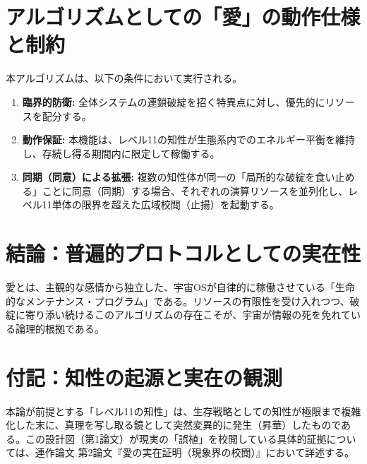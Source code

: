 \documentclass[11pt,a4paper]{article}
\begin{document}
\section{アルゴリズムとしての「愛」の動作仕様と制約}
本アルゴリズムは、以下の条件において実行される。
\begin{enumerate}
    \item \textbf{臨界的防衛:} 全体システムの連鎖破綻を招く特異点に対し、優先的にリソースを配分する。
    \item \textbf{動作保証:} 本機能は、レベル11の知性が生態系内でのエネルギー平衡を維持し、存続し得る期間内に限定して稼働する。
    \item \textbf{同期（同意）による拡張:} 複数の知性体が同一の「局所的な破綻を食い止める」ことに同意（同期）する場合、それぞれの演算リソースを並列化し、レベル11単体の限界を超えた広域校閲（止揚）を起動する。
\end{enumerate}

\section{結論：普遍的プロトコルとしての実在性}
愛とは、主観的な感情から独立した、宇宙OSが自律的に稼働させている「生命的なメンテナンス・プログラム」である。リソースの有限性を受け入れつつ、破綻に寄り添い続けるこのアルゴリズムの存在こそが、宇宙が情報の死を免れている論理的根拠である。

\section{付記：知性の起源と実在の観測}
本論が前提とする「レベル11の知性」は、生存戦略としての知性が極限まで複雑化した末に、真理を写し取る鏡として突然変異的に発生（昇華）したものである。この設計図（第1論文）が現実の「誤植」を校閲している具体的証拠については、連作論文 第2論文『愛の実在証明（現象界の校閲）』において詳述する。
\end{document}
